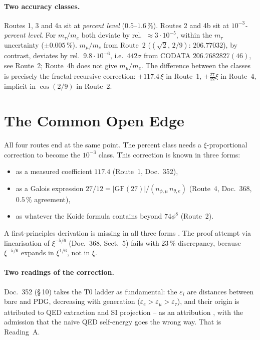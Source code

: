 \paragraph{Two accuracy classes.}
Routes 1, 3 and 4a sit at \emph{percent level} ($0{.}5$--$1{.}6\,\%$). Routes 2
and 4b sit at \emph{$10^{-3}$-percent level}. For $m_\tau/m_e$ both deviate by
rel.\ ${\approx}3\cdot10^{-5}$, within the $m_\tau$ uncertainty
($\pm0.005\,\%$). $m_\mu/m_e$ from Route~2 ($(\sqrt2,\,2/9)$: $206.77032$), by
contrast, deviates by rel.\ $9.8\cdot10^{-6}$, i.e.\ $442\sigma$ from CODATA
$206.7682827(46)$, see Route~2; Route~4b does not give $m_\mu/m_e$. The
difference between the classes is precisely the fractal-recursive correction:
$+117{.}4\,\xi$ in Route~1, $+\tfrac{27}{12}\xi$ in Route~4, implicit in
$\cos(2/9)$ in Route~2.

\section{The Common Open Edge}

All four routes end at the same point. The percent class needs a
$\xi$-proportional correction to become the $10^{-3}$ class. This correction is
known in three forms:
\begin{itemize}
  \item as a measured coefficient $117{.}4$ (Route~1, Doc.~352),
  \item as a Galois expression $27/12 = |\text{GF}(27)|/(n_{\phi,\mu}\,n_{\theta,e})$
    (Route~4, Doc.~368, $0{.}5\,\%$ agreement),
  \item as whatever the Koide formula contains beyond $74\phi^8$ (Route~2).
\end{itemize}
A first-principles derivation is missing in all three forms \SM. The proof attempt
via linearisation of $\xi^{-5/6}$ (Doc.~368, Sect.~5) fails with $23\,\%$
discrepancy, because $\xi^{-5/6}$ expands in $\xi^{1/6}$, not in $\xi$.

\paragraph{Two readings of the correction.}
Doc.~352 (§\,10) takes the T0 ladder as fundamental: the $\varepsilon_i$ are
distances between bare and PDG, decreasing with generation
($\varepsilon_e>\varepsilon_\mu>\varepsilon_\tau$), and their origin is
attributed to QED extraction and SI projection -- as an attribution \SM, with the
admission that the naive QED self-energy goes the wrong way. That is Reading~A.

